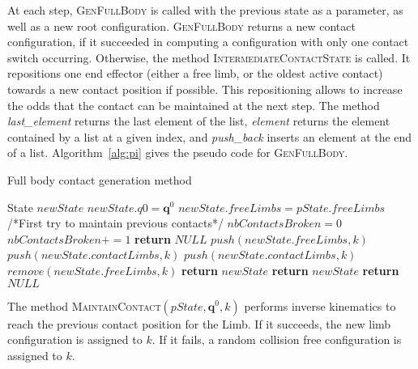 At each step, \textsc{GenFullBody} is called with the previous state as a parameter, as well
as a new root configuration. \textsc{GenFullBody} returns a new contact configuration, if it succeeded
in computing a configuration with only one contact switch occurring.
Otherwise, the method \textsc{IntermediateContactState} is called.
It repositions one end effector (either a free limb, or the oldest active contact) towards a new contact position if possible.
This repositioning allows to increase the odds that the contact can be maintained at the next step.
The method \textit{last\_element} returns the last element
of the list, \textit{element} returns the element contained by a list at a given index, and \textit{push\_back} inserts an element at the end of a list.
Algorithm~\ref{alg:pi} gives the pseudo code for \textsc{GenFullBody}.

\begin{algorithm}[!tbp]
\caption{Full body contact generation method} \label{interpolate}
	\begin{algorithmic}[1]
		\State State $newState$
		\State $newState.q0 = \mathbf{q}^0$
		\State $newState.freeLimbs = pState.freeLimbs$
		\State /*First try to maintain previous contacts*/
		\State $nbContactsBroken = 0$
				\State $nbContactsBroken += 1$
					\State \textbf{return} $NULL$
				\EndIf				
				\State $push(newState.freeLimbs,k)$
			\Else 					
				\State $push(newState.contactLimbs,k)$
			\EndIf
		\EndFor
				\State $push(newState.contactLimbs,k)$
				\State $remove(newState.freeLimbs,k)$		
				\State \textbf{return} $newState$
			\EndIf
		\EndFor
			\State \textbf{return} $newState$
		\Else
			\State \textbf{return} $NULL$
		\EndIf
	\EndFunction
\end{algorithmic}
\label{alg:pi}
\end{algorithm}

The method \textsc{MaintainContact}$(pState,\mathbf{q}^0,k)$ performs inverse kinematics to reach the previous contact position for the Limb.
If it succeeds, the new limb configuration is assigned to $k$. If it fails, a random collision free configuration is assigned to $k$.

